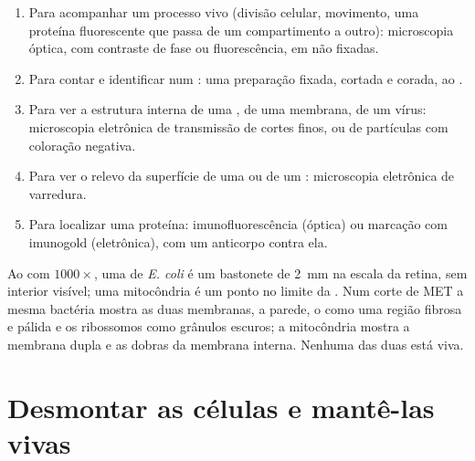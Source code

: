 \begin{method}\label{met:b1:cell-unit-of-life:choose}
\begin{enumerate}
  \item Para acompanhar um processo vivo (divisão celular, movimento,
        uma proteína fluorescente que passa de um compartimento a
        outro): microscopia óptica, com contraste de fase ou
        fluorescência, em  não fixadas.
  \item Para contar e identificar  num : uma preparação
        fixada, cortada e corada, ao .
  \item Para ver a estrutura interna de uma , de uma membrana,
        de um vírus: microscopia eletrônica de transmissão de cortes
        finos, ou de partículas com coloração negativa.
  \item Para ver o relevo da superfície de uma  ou de um :
        microscopia eletrônica de varredura.
  \item Para localizar uma proteína: imunofluorescência (óptica) ou
        marcação com imunogold (eletrônica), com um anticorpo contra ela.
\end{enumerate}
\end{method}

\begin{example}\label{ex:b1:cell-unit-of-life:seeing}
Ao  com $1000\times$, uma  de \emph{E. coli} é
um bastonete de \qty{2}{mm} na escala da retina, sem interior visível;
uma mitocôndria é um ponto no limite da . Num corte de MET a
mesma bactéria mostra as duas membranas, a parede, o  como uma
região fibrosa e pálida e os ribossomos como grânulos escuros; a
mitocôndria mostra a membrana dupla e as dobras da membrana interna.
Nenhuma das duas está viva.
\end{example}

\section{Desmontar as células e mantê-las vivas}

